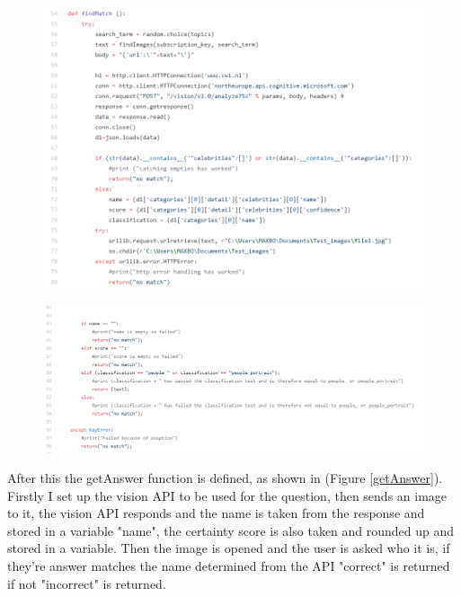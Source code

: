 \documentclass[12pt,a4paper]{article}
\begin{document}
\begin{figure}
\centering
\begin{minipage}{.5\textwidth}
  \centering
  \includegraphics[width=1\linewidth]{Figs/findmatch1.PNG}
  \label{findmatch1}
\end{minipage}%
\begin{minipage}{.5\textwidth}
  \centering
  \includegraphics[width=1\linewidth]{Figs/findmatch2.PNG}
  \label{findmatch2}
\end{minipage}
\end{figure}   

After this the getAnswer function is defined, as shown in (Figure \ref{getAnswer}). Firstly I set up the vision API to be used for the question, then sends an image to it, the vision API responds and the name is taken from the response and stored in a variable "name", the certainty score is also taken and rounded up and stored in a variable. Then the image is opened and the user is asked who it is, if they're answer matches the name determined from the API "correct" is returned if not "incorrect" is returned. 
\end{document}
